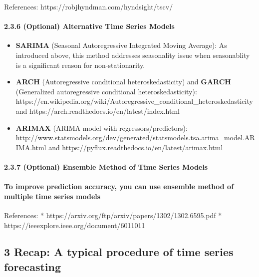 \documentclass[11pt]{article}
\providecommand{\tightlist}{%
      \setlength{\itemsep}{0pt}\setlength{\parskip}{0pt}}
\begin{document}
References: https://robjhyndman.com/hyndsight/tscv/

    \paragraph{2.3.6 (Optional) Alternative Time Series
Models}\label{optional-alternative-time-series-models}

\begin{itemize}
\tightlist
\item
  \textbf{SARIMA} (Seasonal Autoregressive Integrated Moving Average):
  As introduced above, this method addresses seasonality issue when
  seasonablity is a significant reason for non-stationarity.
\item
  \textbf{ARCH} (Autoregressive conditional heteroskedasticity) and
  \textbf{GARCH} (Generalized autoregressive conditional
  heteroskedasticity):
  https://en.wikipedia.org/wiki/Autoregressive\_conditional\_heteroskedasticity
  and https://arch.readthedocs.io/en/latest/index.html
\item
  \textbf{ARIMAX} (ARIMA model with regressors/predictors):
  http://www.statsmodels.org/dev/generated/statsmodels.tsa.arima\_model.ARIMA.html
  and https://pyflux.readthedocs.io/en/latest/arimax.html
\end{itemize}

    \paragraph{2.3.7 (Optional) Ensemble Method of Time Series
Models}\label{optional-ensemble-method-of-time-series-models}

\paragraph{To improve prediction accuracy, you can use ensemble method
of multiple time series
models}\label{to-improve-prediction-accuracy-you-can-use-ensemble-method-of-multiple-time-series-models}

References: * https://arxiv.org/ftp/arxiv/papers/1302/1302.6595.pdf *
https://ieeexplore.ieee.org/document/6011011

    \subsection{3 Recap: A typical procedure of time series
forecasting}\label{recap-a-typical-procedure-of-time-series-forecasting}
\end{document}
